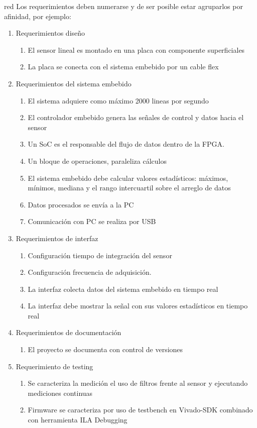 \documentclass[
11pt, %
codirector, %
]{charter}
\begin{document}
\begin{consigna}{red}
Los requerimientos deben numerarse y de ser posible estar agruparlos por afinidad, por ejemplo:

\begin{enumerate}
	\item Requerimientos diseño
		\begin{enumerate}
			\item El sensor lineal es montado en una placa con componente superficiales
			\item La placa se conecta con el sistema embebido por un cable flex
		\end{enumerate}
		
	\item Requerimientos del sistema embebido
		\begin{enumerate}
			\item El sistema adquiere como máximo 2000 lineas por segundo
			\item El controlador embebido genera las señales de control y datos hacia el sensor
			\item Un SoC es el responsable del flujo de datos dentro de la FPGA.
			\item Un bloque de operaciones, paraleliza cálculos
			\item El sistema embebido debe calcular valores estadísticos: máximos, mínimos, mediana y el rango intercuartil sobre el arreglo de datos
			\item Datos procesados se envía a la PC
			\item Comunicación con PC se realiza por USB
		\end{enumerate}
	\item Requerimientos de interfaz
		\begin{enumerate}
			\item Configuración tiempo de integración del sensor
			\item Configuración frecuencia de adquisición.
			\item La interfaz colecta datos del sistema embebido en tiempo real
			\item La interfaz debe mostrar la señal con sus valores estadísticos en tiempo real
		\end{enumerate}
	\item Requerimientos de documentación
		\begin{enumerate}
			\item El proyecto se documenta con control de versiones 
		\end{enumerate}
	\item Requerimiento de testing
	\begin{enumerate}
			\item Se caracteriza la medición el uso de filtros frente al sensor y ejecutando mediciones continuas
			\item Firmware se caracteriza por uso de testbench en Vivado-SDK combinado con herramienta ILA Debugging
		\end{enumerate}
	

\end{enumerate}
\end{consigna}
\end{document}
